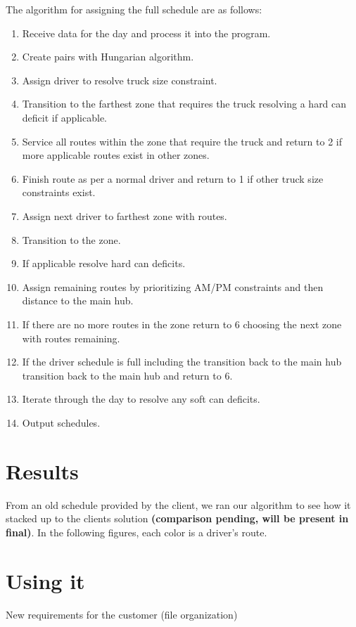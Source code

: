 \documentclass{beamer}
\begin{document}
\begin{frame}
The algorithm for assigning the full schedule are as follows:
\begin{enumerate}
\item Receive data for the day and process it into the program.
\item Create pairs with Hungarian algorithm.
\item Assign driver to resolve truck size constraint.
\item Transition to the farthest zone that requires the truck resolving a hard can deficit if applicable.
\item Service all routes within the zone that require the truck and return to 2 if more applicable routes exist in other zones.
\item Finish route as per a normal driver and return to 1 if other truck size constraints exist.
\item Assign next driver to farthest zone with routes.
\item Transition to the zone.
\item If applicable resolve hard can deficits.
\item Assign remaining routes by prioritizing AM/PM constraints and then distance to the main hub.
\item If there are no more routes in the zone return to 6 choosing the next zone with routes remaining.
\item If the driver schedule is full including the transition back to the main hub transition back to the main hub and return to 6.
\item Iterate through the day to resolve any soft can deficits.
\item Output schedules.
\end{enumerate}
\end{frame}

\section{Results} 
\begin{frame}
From an old schedule provided by the client, we ran our algorithm to see how it stacked up to the clients solution \textbf{(comparison pending, will be present in final)}. In the following figures, each color is a driver's route.
\end{frame}

\section{Using it}
\begin{frame}
	New requirements for the customer (file organization)
\end{frame}
\end{document}

